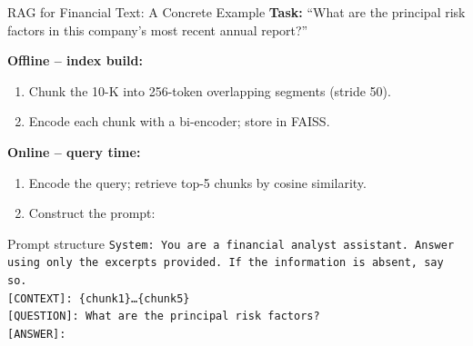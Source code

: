 \documentclass[11pt,aspectratio=169,professionalfonts]{beamer}
\begin{document}
%
%
\begin{frame}{RAG for Financial Text: A Concrete Example}
  \textbf{Task:} ``What are the principal risk factors in this company's
  most recent annual report?''

  \medskip
  \textbf{Offline -- index build:}
  \begin{enumerate}
    \item Chunk the 10-K into 256-token overlapping segments (stride 50).
    \item Encode each chunk with a bi-encoder; store in FAISS.
  \end{enumerate}

  \textbf{Online -- query time:}
  \begin{enumerate}
    \item Encode the query; retrieve top-5 chunks by cosine similarity.
    \item Construct the prompt:
  \end{enumerate}

  \begin{exampleblock}{Prompt structure}
    {\small
    \texttt{System: You are a financial analyst assistant.
    Answer using only the excerpts provided.
    If the information is absent, say so.}\\[0.2em]
    \texttt{[CONTEXT]: \{chunk1\}\ldots\{chunk5\}}\\[0.1em]
    \texttt{[QUESTION]: What are the principal risk factors?}\\[0.1em]
    \texttt{[ANSWER]:}
    }
  \end{exampleblock}
\end{frame}
%
%
\end{document}
